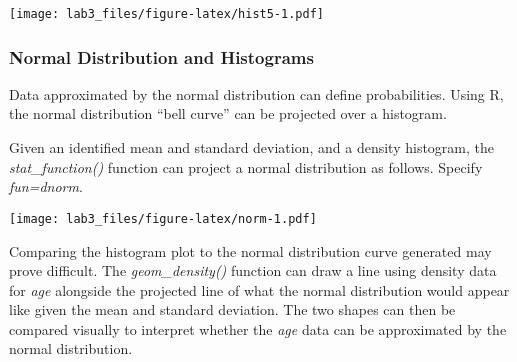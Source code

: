 \documentclass[]{article}
\newenvironment{Shaded}{\begin{snugshade}}{\end{snugshade}}
\newcommand{\KeywordTok}[1]{\textcolor[rgb]{0.13,0.29,0.53}{\textbf{#1}}}
\newcommand{\DataTypeTok}[1]{\textcolor[rgb]{0.13,0.29,0.53}{#1}}
\newcommand{\DecValTok}[1]{\textcolor[rgb]{0.00,0.00,0.81}{#1}}
\newcommand{\StringTok}[1]{\textcolor[rgb]{0.31,0.60,0.02}{#1}}
\newcommand{\OperatorTok}[1]{\textcolor[rgb]{0.81,0.36,0.00}{\textbf{#1}}}
\newcommand{\NormalTok}[1]{#1}
\begin{document}
\texttt{[image: lab3\_files/figure-latex/hist5-1.pdf]}

\subsubsection{Normal Distribution and
Histograms}\label{normal-distribution-and-histograms}

Data approximated by the normal distribution can define probabilities.
Using R, the normal distribution ``bell curve'' can be projected over a
histogram.

Given an identified mean and standard deviation, and a density
histogram, the \emph{stat\_function()} function can project a normal
distribution as follows. Specify \emph{fun=dnorm}.

\begin{Shaded}
\end{Shaded}

\texttt{[image: lab3\_files/figure-latex/norm-1.pdf]}

Comparing the histogram plot to the normal distribution curve generated
may prove difficult. The \emph{geom\_density()} function can draw a line
using density data for \emph{age} alongside the projected line of what
the normal distribution would appear like given the mean and standard
deviation. The two shapes can then be compared visually to interpret
whether the \emph{age} data can be approximated by the normal
distribution.

\begin{Shaded}
\end{Shaded}
\end{document}
